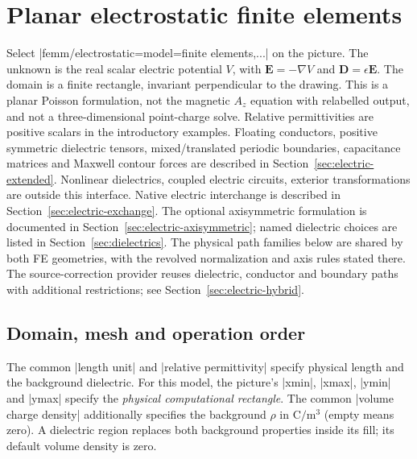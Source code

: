 \section{Planar electrostatic finite elements}
\label{sec:electric-fe}

Select |femm/electrostatic={model=finite elements,...}| on the picture.
The unknown is the real scalar electric potential $V$, with
$\mathbf E=-\nabla V$ and $\mathbf D=\epsilon\mathbf E$. The domain is a finite
rectangle, invariant perpendicular to the drawing. This is a planar Poisson
formulation, not the magnetic $A_z$ equation with relabelled output, and not a
three-dimensional point-charge solve. Relative permittivities are positive
scalars in the introductory examples. Floating conductors, positive symmetric
dielectric tensors, mixed/translated periodic boundaries, capacitance matrices
and Maxwell contour forces are described in Section~\ref{sec:electric-extended}.
Nonlinear dielectrics, coupled electric circuits, exterior transformations
are outside this interface. Native electric interchange is described in
Section~\ref{sec:electric-exchange}. The optional axisymmetric formulation is documented
in Section~\ref{sec:electric-axisymmetric}; named dielectric choices are listed
in Section~\ref{sec:dielectrics}. The physical path families below are shared
by both FE geometries, with the revolved normalization and axis rules stated there.
The source-correction provider reuses dielectric, conductor and boundary paths
with additional restrictions; see Section~\ref{sec:electric-hybrid}.

\subsection{Domain, mesh and operation order}
\label{sec:electric-fe-model}
The common |length unit| and |relative permittivity| specify physical length
and the background dielectric. For this model, the picture's |xmin|, |xmax|,
|ymin| and |ymax| specify the \emph{physical computational rectangle}. The common
|volume charge density| additionally specifies the background $\rho$ in
$\mathrm{C/m^3}$ (empty means zero). A dielectric region replaces both background
properties inside its fill; its default volume density is zero.

